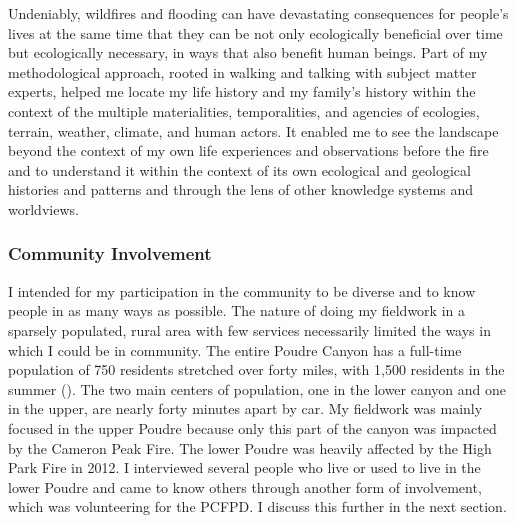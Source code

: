 \documentclass[
]{article}
\begin{document}
Undeniably, wildfires and flooding can have devastating consequences for people's lives at the same time that they can be not only ecologically beneficial over time but ecologically necessary, in ways that also benefit human beings. Part of my methodological approach, rooted in walking and talking with subject matter experts, helped me locate my life history and my family's history within the context of the multiple materialities, temporalities, and agencies of ecologies, terrain, weather, climate, and human actors. It enabled me to see the landscape beyond the context of my own life experiences and observations before the fire and to understand it within the context of its own ecological and geological histories and patterns and through the lens of other knowledge systems and worldviews.

\subsubsection{Community Involvement}\label{community-involvement}

I intended for my participation in the community to be diverse and to know people in as many ways as possible. The nature of doing my fieldwork in a sparsely populated, rural area with few services necessarily limited the ways in which I could be in community. The entire Poudre Canyon has a full-time population of 750 residents stretched over forty miles, with 1,500 residents in the summer (). The two main centers of population, one in the lower canyon and one in the upper, are nearly forty minutes apart by car. My fieldwork was mainly focused in the upper Poudre because only this part of the canyon was impacted by the Cameron Peak Fire. The lower Poudre was heavily affected by the High Park Fire in 2012. I interviewed several people who live or used to live in the lower Poudre and came to know others through another form of involvement, which was volunteering for the PCFPD. I discuss this further in the next section.
\end{document}

